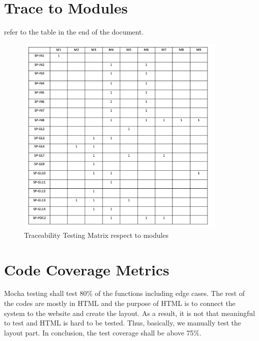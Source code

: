 \documentclass[12pt, titlepage]{article}
\begin{document}
\section{Trace to Modules}	
refer to the table in the end of the document.	
\begin{figure}[h]
\centering
\includegraphics[width=0.9\textwidth]{tracem.png}
\caption{{\color{red}Traceability Testing Matrix respect to modules}}
\label{FigUH}
\end{figure}	
\section{Code Coverage Metrics}
Mocha testing shall test 80\% of the functions including edge cases. The rest of the codes are mostly in HTML and the purpose of HTML is to connect the system to the website and create the layout. As a result, it is not that meaningful to test and HTML is hard to be tested. Thus, basically, we manually test the layout part. In conclusion, the test coverage shall be above 75\%.



\end{document}
